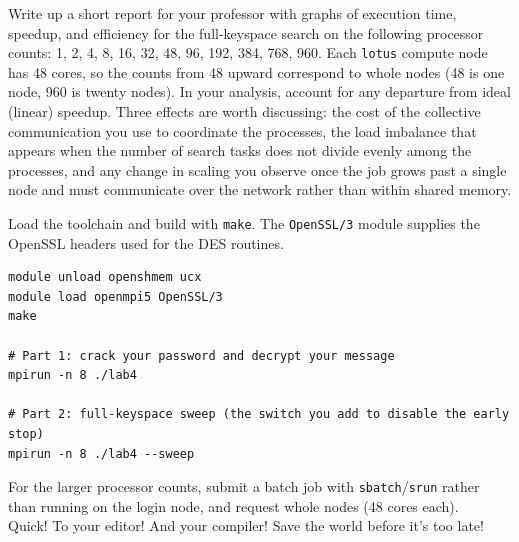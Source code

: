 \documentclass[11pt]{article}
\begin{document}
Write up a short report for your professor with graphs of execution time,
speedup, and efficiency for the full-keyspace search on the following processor
counts: 1, 2, 4, 8, 16, 32, 48, 96, 192, 384, 768, 960. Each {\tt lotus} compute
node has 48 cores, so the counts from 48 upward correspond to whole nodes (48 is
one node, 960 is twenty nodes). In your analysis, account for any departure from
ideal (linear) speedup. Three effects are worth discussing: the cost of the
collective communication you use to coordinate the processes, the load imbalance
that appears when the number of search tasks does not divide evenly among the
processes, and any change in scaling you observe once the job grows past a single
node and must communicate over the network rather than within shared memory.\\


Load the toolchain and build with {\tt make}. The {\tt OpenSSL/3} module
supplies the OpenSSL headers used for the DES routines.

\begin{lstlisting}[basicstyle=\ttfamily\small,frame=single,xleftmargin=1em]
module unload openshmem ucx
module load openmpi5 OpenSSL/3
make

# Part 1: crack your password and decrypt your message
mpirun -n 8 ./lab4

# Part 2: full-keyspace sweep (the switch you add to disable the early stop)
mpirun -n 8 ./lab4 --sweep
\end{lstlisting}

For the larger processor counts, submit a batch job with {\tt sbatch}/{\tt srun}
rather than running on the login node, and request whole nodes (48 cores each).\\

Quick! To your editor! And your compiler! Save the world before it's too late!
\end{document}
